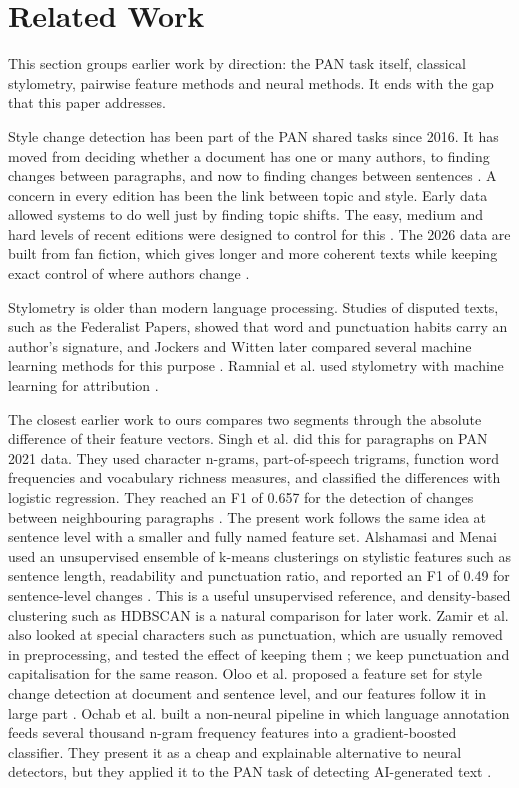 \documentclass[runningheads]{llncs}
\begin{document}
\section{Related Work}
\label{sec:related}

This section groups earlier work by direction: the PAN task itself, classical stylometry, pairwise feature methods and neural methods. It ends with the gap that this paper addresses.

Style change detection has been part of the PAN shared tasks since 2016. It has moved from deciding whether a document has one or many authors, to finding changes between paragraphs, and now to finding changes between sentences \cite{bevendorff2021overview,zangerle_2026_19068843}. A concern in every edition has been the link between topic and style. Early data allowed systems to do well just by finding topic shifts. The easy, medium and hard levels of recent editions were designed to control for this \cite{zangerle2025overview}. The 2026 data are built from fan fiction, which gives longer and more coherent texts while keeping exact control of where authors change \cite{zangerle:2026,bevendorff:2026b}.

Stylometry is older than modern language processing. Studies of disputed texts, such as the Federalist Papers, showed that word and punctuation habits carry an author's signature, and Jockers and Witten later compared several machine learning methods for this purpose \cite{10.1093/llc/fqq001}. Ramnial et al. used stylometry with machine learning for attribution \cite{ramnial2015authorship}.

The closest earlier work to ours compares two segments through the absolute difference of their feature vectors. Singh et al. did this for paragraphs on PAN 2021 data. They used character n-grams, part-of-speech trigrams, function word frequencies and vocabulary richness measures, and classified the differences with logistic regression. They reached an F1 of 0.657 for the detection of changes between neighbouring paragraphs \cite{singh2021writing}. The present work follows the same idea at sentence level with a smaller and fully named feature set. Alshamasi and Menai used an unsupervised ensemble of k-means clusterings on stylistic features such as sentence length, readability and punctuation ratio, and reported an F1 of 0.49 for sentence-level changes \cite{alshamasi2022ensemble}. This is a useful unsupervised reference, and density-based clustering such as HDBSCAN \cite{campello2013density} is a natural comparison for later work. Zamir et al. also looked at special characters such as punctuation, which are usually removed in preprocessing, and tested the effect of keeping them \cite{zamir2024stylometry}; we keep punctuation and capitalisation for the same reason. Oloo et al. proposed a feature set for style change detection at document and sentence level, and our features follow it in large part \cite{oloo2022optimal}. Ochab et al. built a non-neural pipeline in which language annotation feeds several thousand n-gram frequency features into a gradient-boosted classifier. They present it as a cheap and explainable alternative to neural detectors, but they applied it to the PAN task of detecting AI-generated text \cite{ochab2025styloch}.
\end{document}
